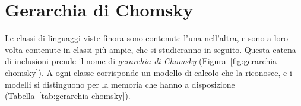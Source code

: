 \documentclass[a4paper, 11pt, oneside]{book}
\theoremstyle{formale}
\begin{document}
    \begingroup
    \renewcommand{\thechapter}{A}
    \renewcommand{\theHchapter}{A}
    \chapter{Gerarchia di Chomsky}
    \label{app:gerarchia-chomsky}
    Le classi di linguaggi viste finora sono contenute l'una nell'altra, e sono a loro
    volta contenute in classi pi\`u ampie, che si studieranno in seguito. Questa catena di
    inclusioni prende il nome di \emph{gerarchia di Chomsky}
    (Figura~\ref{fig:gerarchia-chomsky}). A ogni classe corrisponde un modello di calcolo
    che la riconosce, e i modelli si distinguono per la memoria che hanno a disposizione
    (Tabella~\ref{tab:gerarchia-chomsky}).
\end{document}
